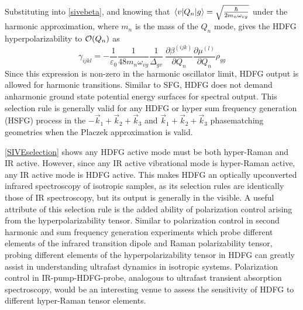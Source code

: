 \documentclass[aip, jcp, reprint, onecolumn]{revtex4-2}
\begin{document}
Substituting into \autoref{sivebeta}, and knowing that $\mel{v}{Q_n}{g} = \sqrt{\frac{\hbar}{2m_n\omega_{vg}}}$ under the harmonic approximation,\cite{RN230} where $m_n$ is the mass of the $Q_n$ mode, gives the HDFG hyperpolarizability to $\order{Q_n}$ as \begin{equation}\label{SIVEselection}
	\gamma_{ijkl} =	-\frac{1}{\varepsilon_0} \frac{1}{48 m_n \omega_{vg}}  \frac{1}{{\Delta_{gv}}} \ \frac{\partial \beta^{(ijk)}}{\partial Q_n} {\frac{\partial \mu^{(l)}}{\partial Q_n}}  \rho_{gg}
\end{equation}
Since this expression is non-zero in the harmonic oscillator limit, HDFG output is allowed for harmonic transitions. 
Similar to SFG, HDFG does not demand anharmonic ground state potential energy surfaces for spectral output. \cite{Shen94, Cho2000}
This selection rule is generally valid for any HDFG or hyper sum frequency generation (HSFG) process in the $-\vec{k}_1 + \vec{k}_2  + \vec{k}_3$ and $\vec{k}_1 + \vec{k}_2  + \vec{k}_3$ phasematching geometries when the Placzek approximation is valid.

\autoref{SIVEselection} shows any HDFG active mode must be both hyper-Raman and IR active.
However, since any IR active vibrational mode is hyper-Raman active,\cite{Cyvin1965, Andrews1978} any IR active mode is HDFG active.
This makes HDFG an optically upconverted infrared spectroscopy of isotropic samples, as its selection rules are identically those of IR spectroscopy, but its output is generally in the visible.
A useful attribute of this selection rule is the added ability of polarization control arising from the hyperpolarizability tensor. 
Similar to polarization control in second harmonic and sum frequency generation experiments which probe different elements of the infrared transition dipole and Raman polarizability tensor,\cite{Heinz1982} probing different elements of the hyperpolarizability tensor in HDFG can greatly assist in understanding ultrafast dynamics in isotropic systems. \cite{Shen90, Bonn2024}
Polarization control in IR-pump-HDFG-probe, analogous to ultrafast transient absorption spectroscopy, would be an interesting venue to assess the sensitivity of HDFG to different hyper-Raman tensor elements.
\end{document}
